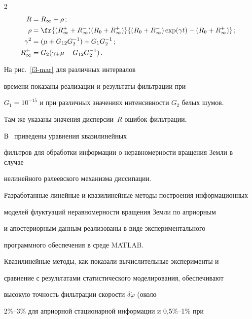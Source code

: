 \begin{multicols}{2}
\begin{align*}
R&= R_\infty +\rho\,;\\


\rho&=     \fr{ (R_\infty^+ + R_\infty^-) (R_0 + R_\infty^+)}{ (R_0 +R_\infty^-)


    \exp (\gamma t) - (R_0+R_\infty^+)}\,;\\


\gamma^2 &= (\mu +G_{12} G_2^{-1}) + G_1 G_2^{-1}\,;\\


R_\infty^\pm &=G_2 (\gamma_\pm \mu - G_{12}G_2^{-1})\,.


\end{align*}








На рис.~\ref{f3-mar} для различных интервалов 


времени показаны реализации и результаты фильтрации при 


$G_1=10^{-15}$ и при различных значениях ин\-тен\-сив\-ности $G_2$ белых шумов. 


Там же указаны значения дисперсии~$R$ ошибок фильтрации.








В~\cite{12-mar} приведены уравнения  квазилинейных 


фильтров для обработки информации о неравномерности вращения Земли в случае


нелинейного рэлеевского механизма диссипации.





Разработанные линейные и  квазилинейные методы построения информационных


моделей  флуктуаций неравномерности вращения Земли по априорным


и апостериорным данным реализованы в виде экспериментального


программного обеспечения в среде   MATLAB.





Квазилинейные методы, как показали вычислительные эксперименты и


сравнение с результатами статистического моделирования, обеспечивают


высокую точность фильтрации скорости $\delta \dot\varphi$ (около


2\%--3\% для априорной стационарной информации и 0,5\%--1\% при



\end{multicols}
